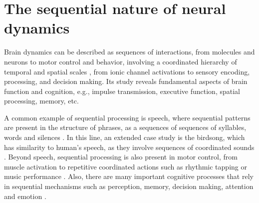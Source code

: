 \section{The sequential nature of neural dynamics}
Brain dynamics can be described as sequences of interactions, from molecules and neurons to motor control and behavior, involving a coordinated hierarchy of temporal and spatial scales \parencite{kiebel_hierarchy_2008,yuste_cortex_2005,rabinovich_discrete_2018,rabinovich_neurons_2023},  from ionic channel activations to sensory encoding, processing, and decision making. Its study reveals fundamental aspects of brain function and cognition, e.g., impulse transmission, executive function, spatial processing, memory, etc.









 A common example of sequential processing is speech, where sequential patterns are present in the structure of phrases, as a sequences of sequences of syllables, words and silences \parencite{kiebel_recognizing_2009}. In this line, an extended case study is the birdsong, which has  similarity to human's speech, as they involve sequences of coordinated sounds \parencite{prather_brains_2017,fishbein_sound_2019}. Beyond speech, sequential processing is also present in motor control, from muscle activation to repetitive coordinated actions such as rhythmic tapping or music performance \parencite{ding_temporal_2017}. Also, there are many important cognitive processes that rely in sequential mechanisms such as perception, memory, decision making, attention and emotion \parencite{varona_hierarchical_2016, he_robust_2018, rabinovich_sequential_2020}.

